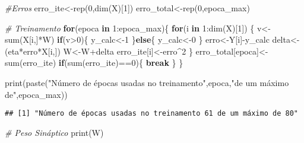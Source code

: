 \documentclass[
]{article}
\newenvironment{Shaded}{\begin{snugshade}}{\end{snugshade}}
\newcommand{\CommentTok}[1]{\textcolor[rgb]{0.56,0.35,0.01}{\textit{#1}}}
\newcommand{\ControlFlowTok}[1]{\textcolor[rgb]{0.13,0.29,0.53}{\textbf{#1}}}
\newcommand{\DecValTok}[1]{\textcolor[rgb]{0.00,0.00,0.81}{#1}}
\newcommand{\FunctionTok}[1]{\textcolor[rgb]{0.00,0.00,0.00}{#1}}
\newcommand{\NormalTok}[1]{#1}
\newcommand{\OtherTok}[1]{\textcolor[rgb]{0.56,0.35,0.01}{#1}}
\newcommand{\SpecialCharTok}[1]{\textcolor[rgb]{0.00,0.00,0.00}{#1}}
\newcommand{\StringTok}[1]{\textcolor[rgb]{0.31,0.60,0.02}{#1}}
\begin{document}
\begin{Shaded}
\begin{Highlighting}[]
\CommentTok{\#Erros}
\NormalTok{erro\_ite}\OtherTok{\textless{}{-}}\FunctionTok{rep}\NormalTok{(}\DecValTok{0}\NormalTok{,}\FunctionTok{dim}\NormalTok{(X)[}\DecValTok{1}\NormalTok{])}
\NormalTok{erro\_total}\OtherTok{\textless{}{-}}\FunctionTok{rep}\NormalTok{(}\DecValTok{0}\NormalTok{,epoca\_max)}

\CommentTok{\# Treinamento}
\ControlFlowTok{for}\NormalTok{(epoca }\ControlFlowTok{in} \DecValTok{1}\SpecialCharTok{:}\NormalTok{epoca\_max)\{}
  \ControlFlowTok{for}\NormalTok{(i }\ControlFlowTok{in} \DecValTok{1}\SpecialCharTok{:}\FunctionTok{dim}\NormalTok{(X)[}\DecValTok{1}\NormalTok{]) \{}
\NormalTok{    v}\OtherTok{\textless{}{-}}\FunctionTok{sum}\NormalTok{(X[i,]}\SpecialCharTok{*}\NormalTok{W)}
    \ControlFlowTok{if}\NormalTok{(v}\SpecialCharTok{\textgreater{}}\DecValTok{0}\NormalTok{)\{}
\NormalTok{      y\_calc}\OtherTok{\textless{}{-}}\DecValTok{1}
\NormalTok{    \}}\ControlFlowTok{else}\NormalTok{\{}
\NormalTok{      y\_calc}\OtherTok{\textless{}{-}}\DecValTok{0}
\NormalTok{    \}}
\NormalTok{    erro}\OtherTok{\textless{}{-}}\NormalTok{Y[i]}\SpecialCharTok{{-}}\NormalTok{y\_calc}
\NormalTok{    delta}\OtherTok{\textless{}{-}}\NormalTok{(eta}\SpecialCharTok{*}\NormalTok{erro}\SpecialCharTok{*}\NormalTok{X[i,])}
\NormalTok{    W}\OtherTok{\textless{}{-}}\NormalTok{W}\SpecialCharTok{+}\NormalTok{delta}
\NormalTok{    erro\_ite[i]}\OtherTok{\textless{}{-}}\NormalTok{erro}\SpecialCharTok{\^{}}\DecValTok{2}
\NormalTok{  \}}
\NormalTok{  erro\_total[epoca]}\OtherTok{\textless{}{-}}\FunctionTok{sum}\NormalTok{(erro\_ite)}
  \ControlFlowTok{if}\NormalTok{(}\FunctionTok{sum}\NormalTok{(erro\_ite)}\SpecialCharTok{==}\DecValTok{0}\NormalTok{)\{}
    \ControlFlowTok{break}
\NormalTok{  \}}
\NormalTok{\}}

\FunctionTok{print}\NormalTok{(}\FunctionTok{paste}\NormalTok{(}\StringTok{"Número de épocas usadas no treinamento"}\NormalTok{,epoca,}\StringTok{"de um máximo de"}\NormalTok{,epoca\_max))}
\end{Highlighting}
\end{Shaded}

\begin{verbatim}
## [1] "Número de épocas usadas no treinamento 61 de um máximo de 80"
\end{verbatim}

\begin{Shaded}
\begin{Highlighting}[]
\CommentTok{\# Peso Sináptico}
\FunctionTok{print}\NormalTok{(W)}
\end{Highlighting}
\end{Shaded}
\end{document}
